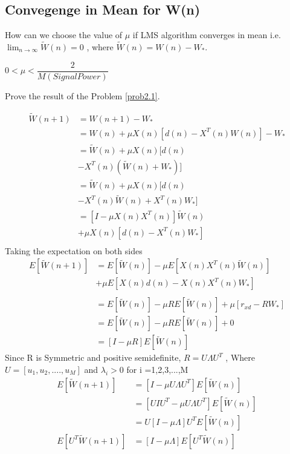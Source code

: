 \documentclass[journal,12pt,twocolumn]{IEEEtran}
\begin{document}
\subsection{Convegenge in Mean for W(n)}
\begin{problem}
How can we choose the value of $\mu$ if LMS algorithm converges in mean i.e. $\lim_{n \to \infty}\tilde W(n) = 0$ , where  $\tilde W(n)= W(n) - W_{*}$. \label{prob2.1}
\end{problem}
\solution
$ 0 < \mu < \dfrac{2}{M(Signal Power)}$
\begin{problem}
Prove the result of the Problem \ref{prob2.1}.
\end{problem}
\solution
\begin{align*}
\tilde W(n+1)&= W(n+1) - W_{*}\\
&=W(n) + \mu X(n)[d(n) - X^{T}(n)W(n)]- W_{*}\\
&=\tilde W(n) + \mu X(n)[d(n) \\ & - X^{T}(n)(\tilde W(n)+W_{*})]\\
&=\tilde W(n) + \mu X(n)[d(n) \\ &- X^{T}(n)\tilde W(n)+X^{T}(n) W_{*}] \\
&= [I - \mu X(n) X^{T}(n)]\tilde W(n) \\ &+ \mu X(n)[d(n)-X^{T}(n) W_{*}]\\
\end{align*}
Taking the expectation on both sides
\begin{align*}
E[\tilde W(n+1)]&=E[\tilde W(n)] - \mu E[X(n) X^{T}(n)\tilde W(n)] \\ &+ \mu E[X(n)d(n)-X(n)X^{T}(n) W_{*}]\\\\
&=E[\tilde W(n)]- \mu R E[\tilde W(n)] + \mu [r_{xd} - R W_{*}] \\
&=E[\tilde W(n)]- \mu R E[\tilde W(n)] + 0 \\
&=[I - \mu R]E[\tilde W(n)]
\end{align*}
Since R is Symmetric and positive semidefinite,
$ R=U \Lambda U^{T}$ , Where $U = [u_1,u_2,....,u_M]$ and $\lambda_i > 0$ for i =1,2,3,...,M
\begin{align*}
E[\tilde W(n+1)]&=[I - \mu U \Lambda U^{T}]E[\tilde W(n)] \\
&=[ U I U^{T} - \mu U \Lambda U^{T}]E[\tilde W(n)]\\
&=U[I  - \mu \Lambda]U^{T}E[\tilde W(n)]\\
E[U^{T}\tilde W(n+1)]&=[I  - \mu \Lambda]E[U^{T}\tilde W(n)]
\\
\end{align*}
\end{document}
